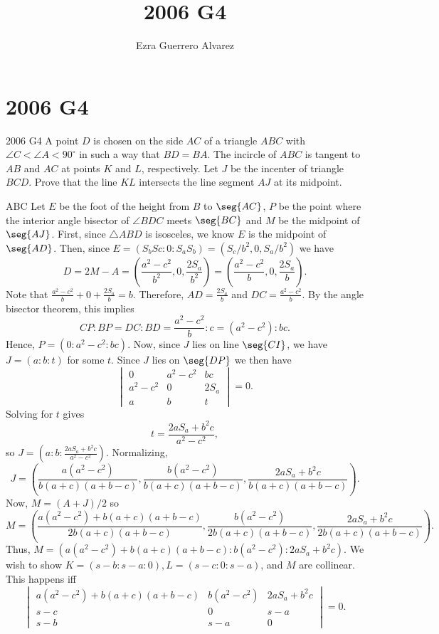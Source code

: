 \documentclass[14pt]{article}
\title{2006 G4}
\author{Ezra Guerrero Alvarez}
\begin{document}
\maketitle
	
\section*{2006 G4}

\begin{statement}{2006 G4}
	A point $D$ is chosen on the side $AC$ of a triangle $ABC$ with $\angle C < \angle A < 90^\circ$ in such a way that $BD=BA$. The incircle of $ABC$ is tangent to $AB$ and $AC$ at points $K$ and $L$, respectively. Let $J$ be the incenter of triangle $BCD$. Prove that the line $KL$ intersects the line segment $AJ$ at its midpoint.
\end{statement}
\bary ABC Let $E$ be the foot of the height from $B$ to $\seg{AC}$, $P$ be the point where the interior angle bisector of $\angle BDC$ meets $\seg{BC}$ and $M$ be the midpoint of $\seg{AJ}$. First, since $\triangle ABD$ is isosceles, we know $E$ is the midpoint of $\seg{AD}$. Then, since $E=(S_bSc:0:S_aS_b)=(S_c/b^2,0,S_a/b^2)$ we have
\[ D=2M-A=\left(\frac{a^2-c^2}{b^2},0,\frac{2S_a}{b^2}\right)=\left(\frac{a^2-c^2}{b},0,\frac{2S_a}{b}\right). \]
Note that $\frac{a^2-c^2}b+0+\frac{2S_a}b=b$. Therefore, $AD=\frac{2S_a}b$ and $DC=\frac{a^2-c^2}b$. By the angle bisector theorem, this implies
\[ CP\colon BP = DC\colon BD = \frac{a^2-c^2}b\colon c = (a^2-c^2)\colon bc. \]
Hence, $P=(0:a^2-c^2:bc)$. Now, since $J$ lies on line $\seg{CI}$, we have $J=(a:b:t)$ for some $t$. Since $J$ lies on $\seg{DP}$ we then have
\[ \begin{vmatrix}
	0&a^2-c^2&bc\\a^2-c^2&0&2S_a\\a&b&t
\end{vmatrix}=0. \]
Solving for $t$ gives 
\[ t=\frac{2aS_a+b^2c}{a^2-c^2}, \]
so $J=\left(a:b:\frac{2aS_a+b^2c}{a^2-c^2}\right)$. Normalizing,
\[ J = \left(\frac{a(a^2-c^2)}{b(a+c)(a+b-c)},\frac{b(a^2-c^2)}{b(a+c)(a+b-c)},\frac{2aS_a+b^2c}{b(a+c)(a+b-c)}\right). \]
Now, $M=(A+J)/2$ so
\[ M=\left(\frac{a(a^2-c^2)+b(a+c)(a+b-c)}{2b(a+c)(a+b-c)},\frac{b(a^2-c^2)}{2b(a+c)(a+b-c)},\frac{2aS_a+b^2c}{2b(a+c)(a+b-c)}\right). \]
Thus, $M=(a(a^2-c^2)+b(a+c)(a+b-c):b(a^2-c^2):2aS_a+b^2c)$. We wish to show $K=(s-b:s-a:0),L=(s-c:0:s-a)$, and $M$ are collinear. This happens iff
\[ \begin{vmatrix}
	a(a^2-c^2)+b(a+c)(a+b-c)&b(a^2-c^2)&2aS_a+b^2c\\
	s-c&0&s-a\\
	s-b&s-a&0
\end{vmatrix} = 0. \]
\end{document}
